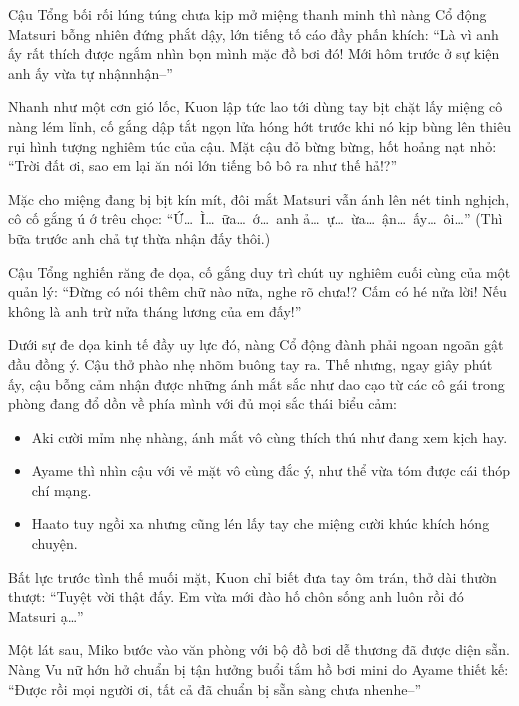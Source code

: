 \documentclass[../main.tex]{subfiles}
\begin{document}
Cậu Tổng bối rối lúng túng chưa kịp mở miệng thanh minh thì nàng Cổ động Matsuri bỗng nhiên đứng phắt dậy, lớn tiếng tố cáo đầy phấn khích:
``Là vì anh ấy rất thích được ngắm nhìn bọn mình mặc đồ bơi đó! Mới hôm trước ở sự kiện anh ấy vừa tự nhậnnhận--''

Nhanh như một cơn gió lốc, Kuon lập tức lao tới dùng tay bịt chặt lấy miệng cô nàng lém lỉnh, cố gắng dập tắt ngọn lửa hóng hớt trước khi nó kịp bùng lên thiêu rụi hình tượng nghiêm túc của cậu. Mặt cậu đỏ bừng bừng, hốt hoảng nạt nhỏ:
``Trời đất ơi, sao em lại ăn nói lớn tiếng bô bô ra như thế hả!?''

Mặc cho miệng đang bị bịt kín mít, đôi mắt Matsuri vẫn ánh lên nét tinh nghịch, cô cố gắng ú ớ trêu chọc:
``Ứ\dots\ Ì\dots\ ữa\dots\ ớ\dots\ anh ả\dots\ ự\dots\ ừa\dots\ ận\dots\ ấy\dots\ ôi\dots'' (Thì bữa trước anh chả tự thừa nhận đấy thôi.)

Cậu Tổng nghiến răng đe dọa, cố gắng duy trì chút uy nghiêm cuối cùng của một quản lý:
``Đừng có nói thêm chữ nào nữa, nghe rõ chưa!? Cấm có hé nửa lời! Nếu không là anh trừ nửa tháng lương của em đấy!''

Dưới sự đe dọa kinh tế đầy uy lực đó, nàng Cổ động đành phải ngoan ngoãn gật đầu đồng ý. Cậu thở phào nhẹ nhõm buông tay ra. Thế nhưng, ngay giây phút ấy, cậu bỗng cảm nhận được những ánh mắt sắc như dao cạo từ các cô gái trong phòng đang đổ dồn về phía mình với đủ mọi sắc thái biểu cảm:

\begin{itemize}
  \item Aki cười mỉm nhẹ nhàng, ánh mắt vô cùng thích thú như đang xem kịch hay.
  \item Ayame thì nhìn cậu với vẻ mặt vô cùng đắc ý, như thể vừa tóm được cái thóp chí mạng.
  \item Haato tuy ngồi xa nhưng cũng lén lấy tay che miệng cười khúc khích hóng chuyện.
\end{itemize}

Bất lực trước tình thế muối mặt, Kuon chỉ biết đưa tay ôm trán, thở dài thườn thượt:
``Tuyệt vời thật đấy. Em vừa mới đào hố chôn sống anh luôn rồi đó Matsuri ạ\dots''

\ct

Một lát sau, Miko bước vào văn phòng với bộ đồ bơi dễ thương đã được diện sẵn. Nàng Vu nữ hớn hở chuẩn bị tận hưởng buổi tắm hồ bơi mini do Ayame thiết kế:
``Được rồi mọi người ơi, tất cả đã chuẩn bị sẵn sàng chưa nhenhe--''

\end{document}
